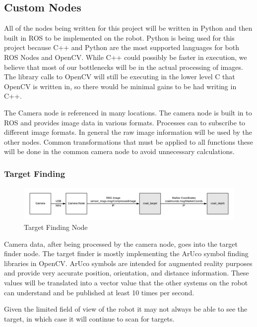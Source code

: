 \documentclass{article}
\begin{document}
	\subsection{Custom Nodes}
	
	 All of the nodes being written for this project will be written in Python and then built in ROS to be implemented on the robot. Python is being used for this project because C++ and Python are the most supported languages for both ROS Nodes and OpenCV. While C++ could possibly be faster in execution, we believe that most of our bottlenecks will be in the actual processing of images. The library calls to OpenCV will still be executing in the lower level C that OpenCV is written in, so there would be minimal gains to be had writing in C++.
	 
	 The Camera node is referenced in many locations. The camera node is built in to ROS and provides image data in various formats. Processes can to subscribe to different image formats. In general the raw image information will be used by the other nodes. Common transformations that must be applied to all functions these will be done in the common camera node to avoid unnecessary calculations.
	
	\subsubsection{Target Finding}
	
	\begin{figure}[H]
		\centering
		\includegraphics[width=0.9\linewidth]{TargetDiagram.png}
		\caption{Target Finding Node}
		\label{fig:target}
	\end{figure}

	Camera data, after being processed by the camera node, goes into the target finder node. The target finder is mostly implementing the ArUco symbol finding libraries in OpenCV. ArUco symbols are intended for augmented reality purposes and provide very accurate position, orientation, and distance information. These values will be translated into a vector value that the other systems on the robot can understand and be published at least 10 times per second.
	
	Given the limited field of view of the robot it may not always be able to see the target, in which case it will continue to scan for targets.
	
\end{document}
